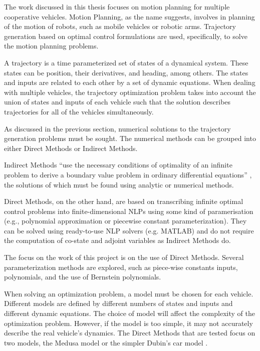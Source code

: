 \par The work discussed in this thesis focuses on motion planning for multiple cooperative vehicles. Motion Planning, as the name suggests, involves in planning of the motion of robots, such as mobile vehicles or robotic arms. Trajectory generation based on optimal control formulations are used, specifically, to solve the motion planning problems. 
\par A trajectory is a time parameterized set of states of a dynamical system. These states can be position, their derivatives, and heading, among others. The states and inputs are related to each other by a set of dynamic equations. When dealing with multiple vehicles, the trajectory optimization problem takes into account the union of states and inputs of each vehicle such that the solution describes trajectories for all of the vehicles simultaneously.
\par As discussed in the previous section, numerical solutions to the trajectory generation problems must be sought. The numerical methods can be grouped into either Direct Methods or Indirect Methods. 
\par Indirect Methods “use the necessary conditions of optimality of an infinite problem to derive a boundary value problem in ordinary differential equations” \cite{diehl2006fast}, the solutions of which must be found using analytic or numerical methods. 
\par Direct Methods, on the other hand, are based on transcribing infinite optimal control problems into finite-dimensional \acp{NLP} using some kind of paramerisation (e.g., polynomial approximation or piecewise constant parameterization). They can be solved using ready-to-use NLP solvers (e.g. MATLAB) and do not require the computation of co-state and adjoint variables as Indirect Methods do.
\par The focus on the work of this project is on the use of Direct Methods. Several parameterization methods are explored, such as piece-wise constants inputs, polynomials, and the use of Bernstein polynomials.
\par When solving an optimization problem, a model must be chosen for each vehicle. 
Different models are defined by different numbers of states and inputs and different dynamic equations. The choice of model will affect the complexity of the optimization problem. However, if the model is too simple, it may not accurately describe the real vehicle's dynamics. The Direct Methods that are tested focus on two models, the Medusa model \cite{abreu2016medusa} or the simpler Dubin's car model \cite{Reeds1990OPTIMALPF}.


